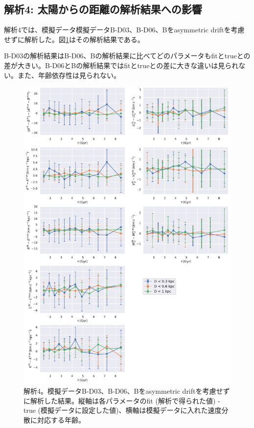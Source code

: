 \subsection{解析4: 太陽からの距離の解析結果への影響}
解析4では、模擬データ模擬データB-D03、B-D06、Bをasymmetric driftを考慮せずに解析した。図\ref{fig:Mock_D}はその解析結果である。

B-D03の解析結果はB-D06、Bの解析結果に比べてどのパラメータもfitとtrueとの差が大きい。B-D06とBの解析結果ではfitとtrueとの差に大きな違いは見られない。また、年齢依存性は見られない。

\begin{figure}[htbp]
	\centering
	\includegraphics[width=15cm]{fig/Mock_D.pdf}
	\caption{解析4。模擬データB-D03、B-D06、Bをasymmetric driftを考慮せずに解析した結果。縦軸は各パラメータのfit (解析で得られた値) - true (模擬データに設定した値)、横軸は模擬データに入れた速度分散に対応する年齢。} \label{fig:Mock_D}
\end{figure}

